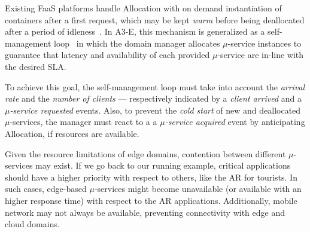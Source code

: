 Existing FaaS platforms handle Allocation with on demand instantiation of containers after a first request, which may be kept \textit{warm} before being deallocated after a period of idleness~\cite{AWSLambda, OpenWhisk}. In A3-E, this mechanism is generalized as a self-management loop~\cite{kephart2003vision} in which the domain manager allocates $\mu$-service instances to guarantee that latency and availability of each provided $\mu$-service are in-line with the desired SLA. 

To achieve this goal, the self-management loop must take into account the \textit{arrival rate} and the \textit{number of clients} --- respectively indicated by a \textit{client arrived} and a \textit{$\mu$-service requested} events. Also, to prevent the \textit{cold start}
of new and deallocated $\mu$-services, 
the manager must react to a 
a \textit{$\mu$-service acquired} event 
by anticipating Allocation, if resources are available.


Given the resource limitations of edge domains, contention between different $\mu$-services may exist. If we go back to our running example,
critical applications should have a higher priority with respect to others, like the AR for tourists. In such cases, edge-based $\mu$-services might become unavailable (or available with an higher response time) with respect to the AR applications. Additionally, mobile network may not always be available, preventing connectivity with edge and cloud domains. 



